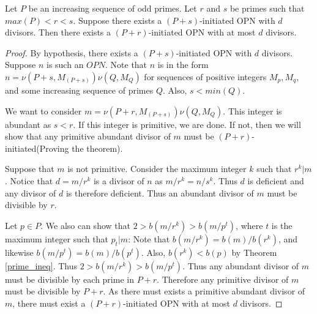 \documentclass[../paper.tex]{subfiles}
\begin{document}
\begin{theorem}
\label{Divisibility}
Let $P$ be an increasing sequence of odd primes. Let $r$ and $s$ be
primes such that $max(P) < r < s$. Suppose there exists a $(P +
s)$-initiated OPN with $d$ divisors. Then there exists a $(P +
r)$-initiated OPN with at most $d$ divisors. 
\end{theorem}

\begin{proof}
By hypothesis, there exists a $(P + s)$-initiated OPN with $d$ divisors.
Suppose $n$ is such an $OPN$. Note that $n$ is in the form $n =
\nu(P + s, M_{(P + s)}) \nu(Q, M_Q)$ for sequences of positive 
integers $M_p, M_q$, and some increasing sequence of primes $Q$.
Also, $s < min(Q)$.

  We want to consider $m = \nu(P + r, M_{(P + s)}) \nu(Q, M_Q)$. 
This integer is abundant as $s < r$. If this integer is primitive,
we are done. If not, then we will show that any primitive abundant
divisor of $m$ must be $(P + r)$-initiated(Proving the theorem).

  Suppose that $m$ is not primitive. Consider the maximum integer
$k$ such that $r^k | m$. Notice that $d = m / r^k$ is a divisor of $n$
as $m / r^k = n / s^k$. Thus $d$ is deficient and any divisor of
$d$ is therefore deficient. Thus an abundant divisor of $m$ must
be divisible by $r$.

Let $p \in P$.  We also can show that $2 > b(m / r^k) > b(m / p^t)$, 
where $t$ is the maximum integer such that $p_t | m$: Note that
$b(m / r^k) = b(m) / b(r^k)$, and likewise $b(m / p^t) = b(m) /
b(p^t)$. Also, $b(r^k) < b(p)$ by Theorem {\ref{prime_ineq}}. Thus
$2 > b(m / r^k) > b(m / p^t)$. Thus any abundant divisor of $m$
must be divisible by each prime in $P + r$. Therefore any
primitive divisor of $m$ must be divisible by $P + r$. As
there must exists a primitive abundant divisor of $m$, there must
exist a $(P + r)$-initiated OPN with at most $d$ divisors.
\end{proof}
\end{document}
